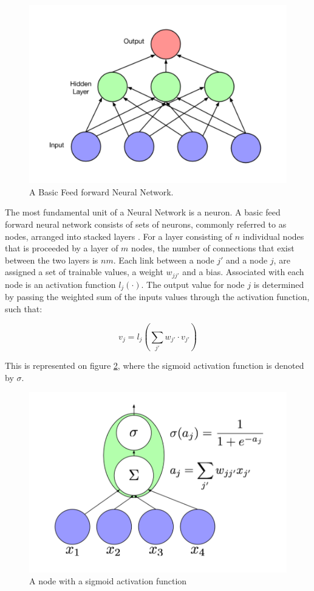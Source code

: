 \documentclass{article}
\begin{document}
\begin{figure}
\centering
\includegraphics[width=1\linewidth]{basic_net.png}
\caption{A Basic Feed forward Neural Network.}
\label{fig:ANN}
\end{figure}

The most fundamental unit of a Neural Network is a neuron. A basic feed forward neural network consists of sets of neurons, commonly referred to as nodes, arranged into stacked layers \cite{ANN}. For a layer consisting of \(n\) individual nodes that is proceeded by a layer of \(m\) nodes, the number of connections that exist between the two layers is \(nm\). Each link between a node \(j'\) and a node \(j\), are assigned a set of trainable values, a weight \(w_{jj'}\) and a bias. Associated with each node is an activation function \(l_j(\cdot)\). The output value for node \(j\) is determined by passing the weighted sum of the inputs values through the activation function, such that:


\begin{equation}
v_j=l_j(\sum_{j'}w_{j'} \cdot v_{j'})
\end{equation}


This is represented on figure \ref{fig:node}, where the sigmoid activation function is denoted by \(\sigma\). 


\begin{figure}
\centering
\includegraphics[width=0.8\linewidth]{node.png}
\caption{A node with a sigmoid activation function}
\label{fig:node}
\end{figure}
\end{document}

